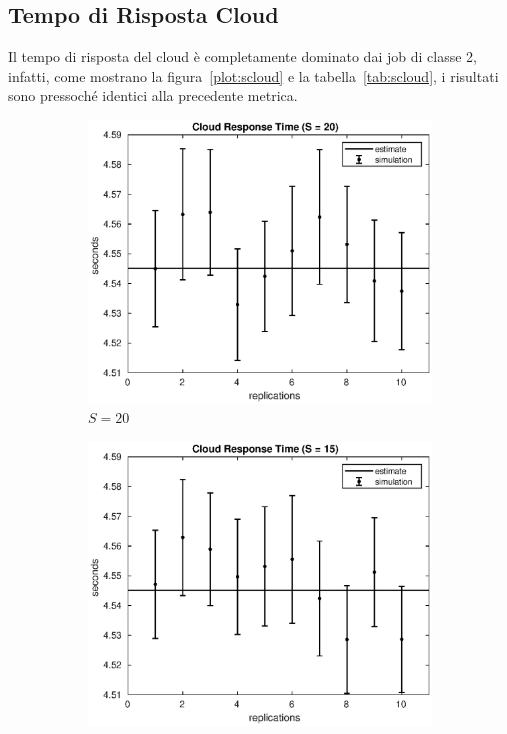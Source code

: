 \subsection{Tempo di Risposta Cloud}
Il tempo di risposta del cloud è completamente dominato dai job di classe 2,
infatti, come mostrano la figura~\ref{plot:scloud} e la
tabella~\ref{tab:scloud}, i risultati sono pressoché identici alla precedente
metrica.
\begin{figure}[!h]
\centering
%
\begin{subfigure}[t]{0.49\textwidth}
\includegraphics[width=\textwidth]{figures/simul/20_500K_scloud}
\caption{$S = 20$}
\label{20_scloud}
\end{subfigure}
%
\begin{subfigure}[t]{0.49\textwidth}
\includegraphics[width=\textwidth]{figures/simul/15_500K_scloud}

\end{subfigure}
\end{figure}
